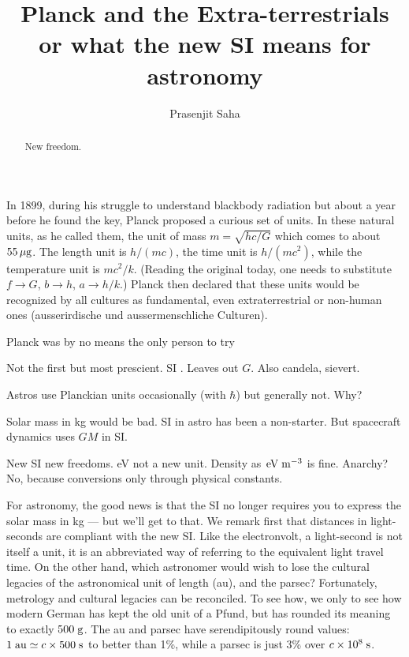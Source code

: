 \documentclass[aps,prb,12pt]{revtex4-1}
\def\unit#1{\;{\rm#1}}
\begin{document}
\title{Planck and the Extra-terrestrials\\
       or what the new SI means for astronomy}

\author{Prasenjit Saha} 

\begin{abstract}
New freedom.
\end{abstract}

\maketitle

In 1899, during his struggle to understand blackbody radiation but
about a year before he found the key, Planck proposed a curious set of
units.\cite{Planck1899} In these natural units, as he called them, the
unit of mass $m=\sqrt{hc/G}$ which comes to about $55\rm\,\mu g$.  The
length unit is $h/(mc)$, the time unit is $h/(mc^2)$, while the
temperature unit is $mc^2/k$.  (Reading the original today, one needs
to substitute $f \rightarrow G$, $b\rightarrow h$, $a\rightarrow
h/k$.)  Planck then declared that these units would be recognized by
all cultures as fundamental, even extraterrestrial or non-human ones
(ausserirdische und aussermenschliche Culturen).

Planck was by no means the only person to try 

Not the first \cite{Tomilin1998} but most prescient.  SI
\cite{Jeckelmann_2018}.  Leaves out $G$.  Also candela, sievert.

Astros use Planckian units occasionally\cite{magicenv} (with $\hbar$)
but generally not.\cite{dodd2011}  Why?

Solar mass in kg would be bad.  SI in astro has been a non-starter.
But spacecraft dynamics uses $GM$ in SI.

New SI new freedoms.  eV not a new unit.  Density as
$\!\unit{eV}\unit{m}^{-3}$ is fine.  Anarchy?  No, because conversions
only through physical constants.

For astronomy, the good news is that the SI no longer requires you to
express the solar mass in kg --- but we'll get to that.  We remark
first that distances in light-seconds are compliant with the new SI.
Like the electronvolt, a light-second is not itself a unit, it is an
abbreviated way of referring to the equivalent light travel time.  On
the other hand, which astronomer would wish to lose the cultural
legacies of the astronomical unit of length (au), and the parsec?
Fortunately, metrology and cultural legacies can be reconciled.  To
see how, we only to see how modern German has kept the old unit of a
Pfund, but has rounded its meaning to exactly $500\unit{g}$.  The au
and parsec have serendipitously round values: $1\unit{au}\simeq
c\times500\unit{s}$ to better than 1\%, while a parsec is just 3\%
over $c\times10^8\unit{s}$.  
\end{document}
